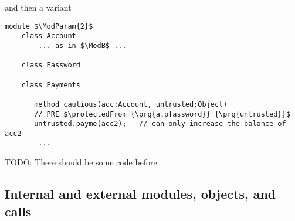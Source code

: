  and then a variant
 
 \begin{lstlisting}[mathescape=true, language=chainmail, frame=lines]
module $\ModParam{2}$
    class Account 
        ... as in $\ModB$ ...
        
    class Password
    
    class Payments
          
       method cautious(acc:Account, untrusted:Object)
       // PRE $\protectedFrom {\prg{a.p[assword}} {\prg{untrusted}}$
       untrusted.payme(acc2);   // can only increase the balance of acc2
        ...
\end{lstlisting}

TODO: There should be some code before 
 
\subsection{Internal and external modules, objects, and calls}
\label{s:concepts}

